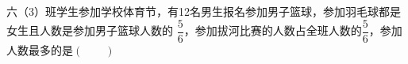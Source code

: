 六（3）班学生参加学校体育节，有12名男生报名参加男子篮球，参加羽毛球都是女生且人数是参加男子篮球人数的
$\dfrac{5}{6}$，参加拔河比赛的人数占全班人数的$\dfrac{5}{6}$，参加人数最多的是\hfill$\left(\qquad\right)$

